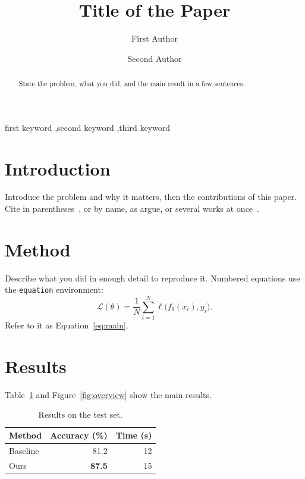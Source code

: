 \documentclass[preprint,12pt,authoryear]{elsarticle}
\begin{document}
\begin{frontmatter}

\title{Title of the Paper}

\author[inst1]{First Author}
\author[inst2]{Second Author}


\begin{abstract}
State the problem, what you did, and the main result in a few sentences.
\end{abstract}

\begin{keyword}
first keyword \sep second keyword \sep third keyword
\end{keyword}

\end{frontmatter}

\section{Introduction}
\label{sec:intro}
Introduce the problem and why it matters, then the contributions of this
paper. Cite in parentheses~\citep{lorenz1963}, or by name, as \citet{macarthur1967} argue, or several works at
once~\citep{lorenz1963,macarthur1967}.

\section{Method}
\label{sec:method}
Describe what you did in enough detail to reproduce it. Numbered equations use
the \texttt{equation} environment:
\begin{equation}
  \label{eq:main}
  \mathcal{L}(\theta) = \frac{1}{N} \sum_{i=1}^{N} \ell\bigl(f_\theta(x_i), y_i\bigr).
\end{equation}
Refer to it as Equation~\eqref{eq:main}.

\section{Results}
\label{sec:results}
Table~\ref{tab:results} and Figure~\ref{fig:overview} show the main results.

\begin{table}[htbp]
  \centering
  \caption{Results on the test set.}
  \label{tab:results}
  \begin{tabular}{lrr}
    \toprule
    Method & Accuracy (\%) & Time (s) \\
    \midrule
    Baseline & 81.2 & 12 \\
    Ours & \textbf{87.5} & 15 \\
    \bottomrule
  \end{tabular}
\end{table}
\end{document}
